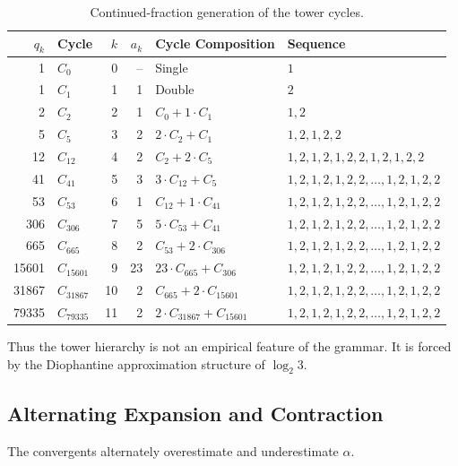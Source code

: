 \documentclass[12pt, oneside]{article}
\numberwithin{equation}{section}
\theoremstyle{definition}
\theoremstyle{plain}
\theoremstyle{remark}
\begin{document}
\begin{table}[ht]
\centering
\caption{Continued-fraction generation of the tower cycles.}
\label{tab:tower-cycles}
\begin{tabular}{r l r r l l}
\hline
$q_k$ & Cycle & $k$ & $a_k$ & Cycle Composition & Sequence \\
\hline
1     & $C_{    0}$ &  0 & -- & Single                          & $1$ \\
1     & $C_{    1}$ &  1 &  1 & Double                          & $2$ \\
2     & $C_{    2}$ &  2 &  1 & $C_{    0} + 1 \cdot C_{    1}$ & $1,2$ \\
5     & $C_{    5}$ &  3 &  2 & $2 \cdot C_{    2} + C_{    1}$ & $1,2,1,2,2$ \\
12    & $C_{   12}$ &  4 &  2 & $C_{    2} + 2 \cdot C_{    5}$ & $1,2,1,2,1,2,2,1,2,1,2,2$ \\
41    & $C_{   41}$ &  5 &  3 & $3 \cdot C_{   12} + C_{    5}$ & $1,2,1,2,1,2,2,\ldots,1,2,1,2,2$  \\
53    & $C_{   53}$ &  6 &  1 & $C_{   12} + 1 \cdot C_{   41}$ & $1,2,1,2,1,2,2,\ldots,1,2,1,2,2$  \\
306   & $C_{  306}$ &  7 &  5 & $5 \cdot C_{   53} + C_{   41}$ & $1,2,1,2,1,2,2,\ldots,1,2,1,2,2$  \\
665   & $C_{  665}$ &  8 &  2 & $C_{   53} + 2 \cdot C_{  306}$ & $1,2,1,2,1,2,2,\ldots,1,2,1,2,2$  \\
15601 & $C_{15601}$ &  9 & 23 & $23 \cdot C_{665} + C_{   306}$ & $1,2,1,2,1,2,2,\ldots,1,2,1,2,2$  \\
31867 & $C_{31867}$ & 10 &  2 & $C_{  665} + 2 \cdot C_{15601}$ & $1,2,1,2,1,2,2,\ldots,1,2,1,2,2$  \\
79335 & $C_{79335}$ & 11 &  2 & $2 \cdot C_{31867} + C_{15601}$ & $1,2,1,2,1,2,2,\ldots,1,2,1,2,2$  \\
\hline
\end{tabular}
\end{table}

Thus the tower hierarchy is not an empirical feature of the grammar.
It is forced by the Diophantine approximation structure of $\log_2 3$.

\subsection{Alternating Expansion and Contraction}

The convergents alternately overestimate and underestimate $\alpha$.
\end{document}
